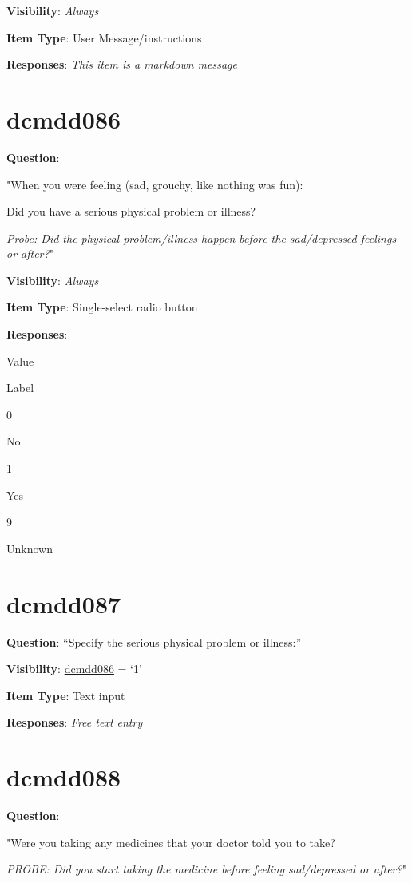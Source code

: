 \documentclass[]{book}
\begin{document}
\textbf{Visibility}: \emph{Always}

\textbf{Item Type}: User Message/instructions

\textbf{Responses}: \emph{This item is a markdown message}

\hypertarget{dcmdd086}{%
\section{dcmdd086}\label{dcmdd086}}

\textbf{Question}:

"When you were feeling (sad, grouchy, like nothing was fun):

Did you have a serious physical problem or illness?

\emph{Probe: Did the physical problem/illness happen before the sad/depressed feelings or after?}"

\textbf{Visibility}: \emph{Always}

\textbf{Item Type}: Single-select radio button

\textbf{Responses}:

Value

Label

0

No

1

Yes

9

Unknown

\hypertarget{dcmdd087}{%
\section{dcmdd087}\label{dcmdd087}}

\textbf{Question}: ``Specify the serious physical problem or illness:''

\textbf{Visibility}: \protect\hyperlink{dcmdd086}{dcmdd086} = `1'

\textbf{Item Type}: Text input

\textbf{Responses}: \emph{Free text entry}

\hypertarget{dcmdd088}{%
\section{dcmdd088}\label{dcmdd088}}

\textbf{Question}:

"Were you taking any medicines that your doctor told you to take?

\emph{PROBE: Did you start taking the medicine before feeling sad/depressed or after?}"
\end{document}
